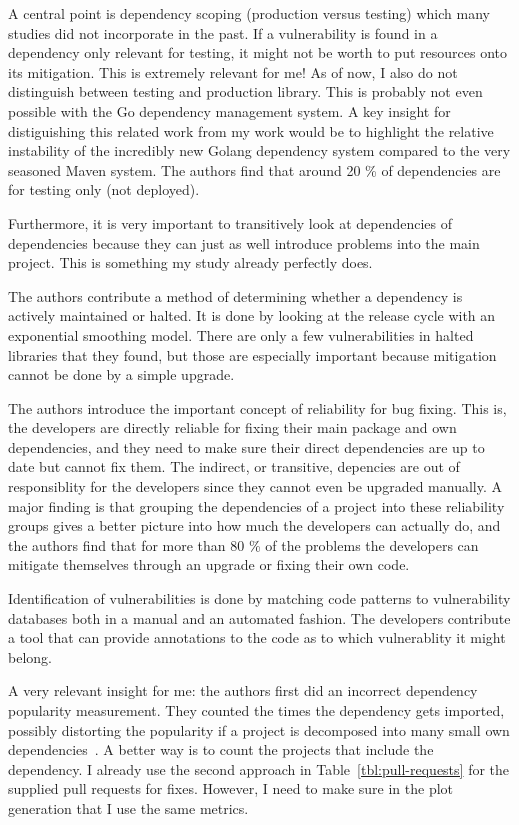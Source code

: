 A central point is dependency scoping (production versus testing) which many studies did not incorporate in the past.
If a vulnerability is found in a dependency only relevant for testing, it might not be worth to put resources onto its
mitigation.
This is extremely relevant for me!
As of now, I also do not distinguish between testing and production library.
This is probably not even possible with the Go dependency management system.
A key insight for distiguishing this related work from my work would be to highlight the relative instability of the
incredibly new Golang dependency system compared to the very seasoned Maven system.
The authors find that around 20 \% of dependencies are for testing only (not deployed).

Furthermore, it is very important to transitively look at dependencies of dependencies because they can just as well
introduce problems into the main project.
This is something my study already perfectly does.

The authors contribute a method of determining whether a dependency is actively maintained or halted.
It is done by looking at the release cycle with an exponential smoothing model.
There are only a few vulnerabilities in halted libraries that they found, but those are especially important because
mitigation cannot be done by a simple upgrade.

The authors introduce the important concept of reliability for bug fixing.
This is, the developers are directly reliable for fixing their main package and own dependencies, and they need to
make sure their direct dependencies are up to date but cannot fix them.
The indirect, or transitive, depencies are out of responsiblity for the developers since they cannot even be upgraded
manually.
A major finding is that grouping the dependencies of a project into these reliability groups gives a better picture into
how much the developers can actually do, and the authors find that for more than 80 \% of the problems the developers
can mitigate themselves through an upgrade or fixing their own code.

Identification of vulnerabilities is done by matching code patterns to vulnerability databases both in a manual and an
automated fashion.
The developers contribute a tool that can provide annotations to the code as to which vulnerablity it might belong.

A very relevant insight for me: the authors first did an incorrect dependency popularity measurement.
They counted the times the dependency gets imported, possibly distorting the popularity if a project is decomposed into
many small own dependencies~\cite{sajnani2014}.
A better way is to count the projects that include the dependency.
I already use the second approach in Table~\ref{tbl:pull-requests} for the supplied pull requests for fixes.
However, I need to make sure in the plot generation that I use the same metrics.

